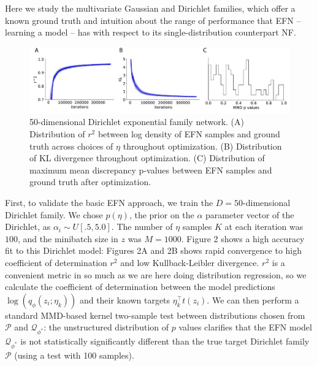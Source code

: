 \documentclass[twoside]{article}
\begin{document}
Here we study the multivariate Gaussian and Dirichlet families, which offer a known ground truth and intuition about the range of performance that EFN -- learning a model – has with respect to its single-distribution counterpart NF. 
%
\begin{figure}
  \centering
\includegraphics[width=1.0\linewidth]{figs/fig2/fig2.pdf}
  \caption{50-dimensional Dirichlet exponential family network.  (A) Distribution of $r^2$ between log density of EFN samples and ground truth across choices of $\eta$ throughout optimization.  (B) Distribution of KL divergence throughout optimization.  (C) Distribution of maximum mean discrepancy p-values between EFN samples and ground truth after optimization.}
\end{figure}
%
First, to validate the basic EFN approach, we train the $D=50$-dimensional Dirichlet family.  We chose $p(\eta)$, the prior on the $\alpha$ parameter vector of the Dirichlet, as $\alpha_i \sim U\left[.5, 5.0\right]$. The number of $\eta$ samples $K$ at each iteration was $100$, and the minibatch size in $z$ was $M=1000$.   Figure 2 shows a high accuracy fit to this Dirichlet model: Figures 2A and 2B shows rapid convergence to high coefficient of determination $r^2$ and low Kullback-Leibler divergence.  $r^2$ is a convenient metric in so much as we are here doing distribution regression, so we calculate the coefficient of determination between the model predictions $\log (q_\phi(z_i; \eta_k))$ and their known targets $\eta_k^\top t(z_i)$.  We can then perform a standard MMD-based kernel two-sample test \citep{gretton2012kernel} between distributions chosen from $\mathcal{P}$ and $\mathcal{Q}_{\phi^*}$: the unstructured distribution of $p$ values clarifies that the EFN model $\mathcal{Q}_{\phi^*}$  is not statistically significantly different than the true target Dirichlet family $\mathcal{P}$ (using a test with 100 samples).
\end{document}
